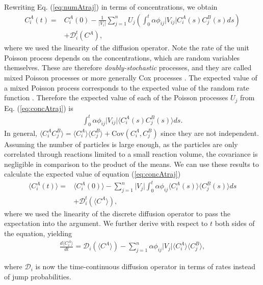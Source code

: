 \documentclass[10pt,twocolumn]{revtex4-1}
\begin{document}
	Rewriting Eq. (\ref{eq:numAtraj}) in terms of concentrations, we obtain
	\begin{align}
	C^A_i(t) =& C^A_i(0)-\frac{1}{ \vert V_i \vert}   \sum_{j=1}^n  U_j\left( \int_0^t\alpha\phi_{ij} \vert V_{ij} \vert C^A_i(s) C^B_j(s) ds \right)
	\nonumber \\
	&+ \mathcal{D}_i^t(C^A),
	\label{eq:concAtraj}
	\end{align}
	where we used the linearity of the diffusion operator.
	Note the rate of the unit Poisson process depends on the concentrations, which are random variables themselves. These are therefore \textit{doubly-stochastic} processes, and they are called mixed Poisson processes or more generally Cox processes \cite{grandell1997mixed, schnoerr2016cox}. The expected value of a mixed Poisson process corresponds to the expected value of the random rate function \cite{grandell1997mixed}. Therefore the expected value of each of the Poisson processes $U_j$ from Eq. (\ref{eq:concAtraj}) is
	\begin{align*}
	\int_0^t\alpha\phi_{ij} \vert V_{ij} \vert  \langle C^A_i(s) C^B_j(s)\rangle ds.
	\end{align*}
	In general, $\langle C^A_i C^B_j\rangle = \langle C^A_i\rangle \langle C^B_j\rangle + \mathrm{Cov}(C^A_i, C^B_j)$ since they are not independent. Assuming the number of particles is large enough, as the particles are only correlated through reactions limited to a small reaction volume, the covariance is negligible in comparison to the product of the means. We can use these results to calculate the expected value of equation (\ref{eq:concAtraj}) 
	\begin{align}
	\langle C^{A}_{i}(t) \rangle =& \langle C^{A}_i(0)\rangle-\sum_{j=1}^n
	\vert V_{j} \vert\int_{0}^{t}\alpha \phi_{ij} \langle C^A_i(s)\rangle \langle C^B_j(s)\rangle ds
	\nonumber
	\\
	&+ \mathcal{D}_i^t(\langle C^A \rangle),
	\label{eq:concAtraj2}
	\end{align}
	where we used the linearity of the discrete diffusion operator to pass the expectation into the argument. We further derive with respect to $t$ both sides of the equation, yielding 
	\begin{align}
	\frac{d\langle C^{A}_{i}\rangle}{dt}=\mathcal{D}_i(\langle C^A \rangle)
	-\sum_{j=1}^n \alpha \phi_{ij}\vert V_j \vert \langle C^A_i\rangle \langle C^B_j\rangle,
	\label{eq:AexpectedConc}
	\end{align}
	
	where $\mathcal{D}_i$ is now the time-continuous diffusion operator in terms of rates instead of jump probabilities. 
	
\end{document}

